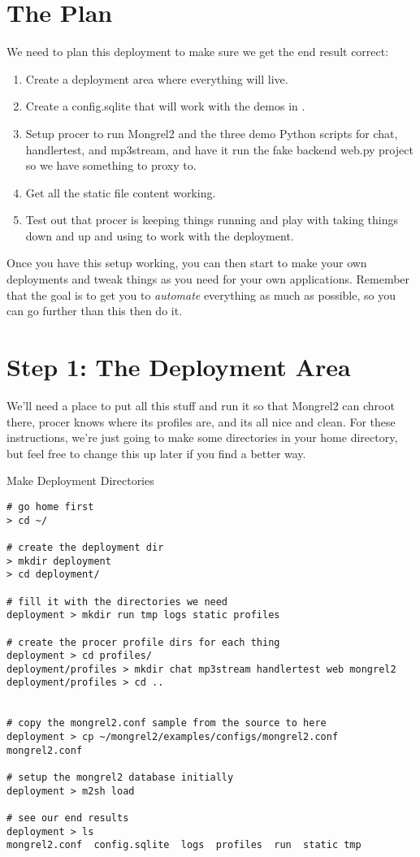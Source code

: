 \section{The Plan}

We need to plan this deployment to make sure we get the end result correct:

\begin{enumerate}
\item Create a deployment area where everything will live.
\item Create a config.sqlite that will work with the demos in .
\item Setup procer to run Mongrel2 and the three demo Python scripts for chat, handlertest, and mp3stream,
    and have it run the fake backend web.py project so we have something to proxy to.
\item Get all the static file content working.
\item Test out that procer is keeping things running and play with taking things down and up and using
     to work with the deployment.
\end{enumerate}

Once you have this setup working, you can then start to make your own
deployments and tweak things as you need for your own applications.  Remember
that the goal is to get you to \emph{automate} everything as much as possible,
so you can go further than this then do it.

\section{Step 1: The Deployment Area}

We'll need a place to put all this stuff and run it so that Mongrel2 can chroot
there, procer knows where its profiles are, and its all nice and clean.  For these
instructions, we're just going to make some directories in your home directory,
but feel free to change this up later if you find a better way.

\begin{code}{Make Deployment Directories}
\begin{lstlisting}
# go home first
> cd ~/

# create the deployment dir
> mkdir deployment
> cd deployment/

# fill it with the directories we need
deployment > mkdir run tmp logs static profiles

# create the procer profile dirs for each thing
deployment > cd profiles/
deployment/profiles > mkdir chat mp3stream handlertest web mongrel2
deployment/profiles > cd ..


# copy the mongrel2.conf sample from the source to here
deployment > cp ~/mongrel2/examples/configs/mongrel2.conf mongrel2.conf

# setup the mongrel2 database initially
deployment > m2sh load

# see our end results
deployment > ls
mongrel2.conf  config.sqlite  logs  profiles  run  static tmp

\end{lstlisting}
\end{code}

